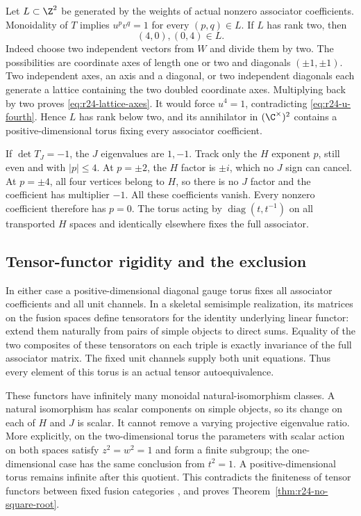 Let $L\subset\Z^2$ be generated by the weights of actual nonzero
associator coefficients. Monoidality of $T$ implies
$u^pv^q=1$ for every $(p,q)\in L$. If $L$ has rank two, then
\begin{equation}\label{eq:r24-lattice-axes}
 (4,0),(0,4)\in L.
\end{equation}
Indeed choose two independent vectors from $W$ and divide them by
two. The possibilities are coordinate axes of length one or two and
diagonals $(\pm1,\pm1)$. Two independent axes, an axis and a diagonal,
or two independent diagonals each generate a lattice containing the
two doubled coordinate axes. Multiplying back by two proves
\eqref{eq:r24-lattice-axes}. It would force $u^4=1$, contradicting
\eqref{eq:r24-u-fourth}. Hence $L$ has rank below two, and its
annihilator in $(\C^\times)^2$ contains a positive-dimensional torus
fixing every associator coefficient.

If $\det T_J=-1$, the $J$ eigenvalues are $1,-1$. Track only the
$H$ exponent $p$, still even and with $|p|\le4$. At $p=\pm2$,
the $H$ factor is $\pm i$, which no $J$ sign can cancel. At
$p=\pm4$, all four vertices belong to $H$, so there is no $J$ factor
and the coefficient has multiplier $-1$. All these coefficients
vanish. Every nonzero coefficient therefore has $p=0$. The torus
acting by $\operatorname{diag}(t,t^{-1})$ on all transported $H$
spaces and identically elsewhere fixes the full associator.

\subsection{Tensor-functor rigidity and the exclusion}
In either case a positive-dimensional diagonal gauge torus fixes all
associator coefficients and all unit channels. In a skeletal semisimple
realization, its matrices on the fusion spaces define tensorators for
the identity underlying linear functor: extend them naturally from
pairs of simple objects to direct sums. Equality of the two composites
of these tensorators on each triple is exactly invariance of the full
associator matrix. The fixed unit channels supply both unit equations.
Thus every element of this torus is an actual tensor autoequivalence.

These functors have infinitely many monoidal natural-isomorphism
classes. A natural isomorphism has scalar components on simple objects,
so its change on each of $H$ and $J$ is scalar. It cannot remove a
varying projective eigenvalue ratio. More explicitly, on the
two-dimensional torus the parameters with scalar action on both
spaces satisfy $z^2=w^2=1$ and form a finite subgroup; the one-dimensional
case has the same conclusion from $t^2=1$. A positive-dimensional
torus remains infinite after this quotient. This contradicts the
finiteness of tensor functors between fixed fusion categories
\cite[Theorem~2.31]{ENO}, and proves
Theorem~\ref{thm:r24-no-square-root}.


